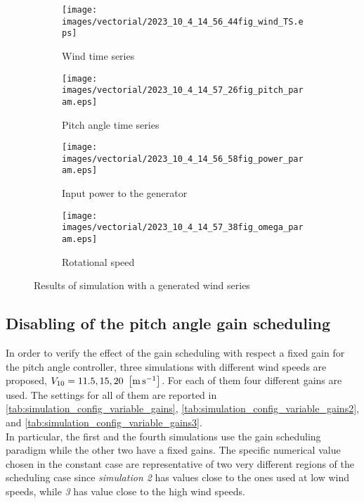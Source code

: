 \begin{figure}[htb]
  \begin{subfigure}{0.49\columnwidth}
    \centering
    \texttt{[image: images/vectorial/2023\_10\_4\_14\_56\_44fig\_wind\_TS.eps]}
    \caption{Wind time series}
    \label{fig:2023_05_1_00_55_48fig_wind_TS.eps}
  \end{subfigure}
  \begin{subfigure}{0.49\columnwidth}
    \centering
    \texttt{[image: images/vectorial/2023\_10\_4\_14\_57\_26fig\_pitch\_param.eps]}
    \caption{Pitch angle time series}
    \label{fig:2023_05_1_00_50_19fig_power_param}
  \end{subfigure}
  \begin{subfigure}{0.49\columnwidth}
    \centering
    \texttt{[image: images/vectorial/2023\_10\_4\_14\_56\_58fig\_power\_param.eps]}
    \caption{Input power to the generator}
    \label{fig:2023_05_1_00_51_17fig_omega_param}
  \end{subfigure}
  \begin{subfigure}{0.49\columnwidth}
    \centering
    \texttt{[image: images/vectorial/2023\_10\_4\_14\_57\_38fig\_omega\_param.eps]}
    \caption{Rotational speed}
    \label{fig:2023_05_1_00_50_58fig_pitch_param}
  \end{subfigure}
  \caption{Results of simulation with a generated wind series}
  \label{fig:simulation_rand_wind_NPC}
\end{figure}

\subsection{Disabling of the pitch angle gain scheduling}\label{subsec:gain_scheduling_disabling}
In order to verify the effect of the gain scheduling with respect a fixed gain for the pitch angle controller, three simulations with different wind speeds are proposed, $V_{10} = 11.5, 15, 20 \ \left[\si{\meter\per\second}\right]$. For each of them four different gains are used. The settings for all of them are reported in \autoref{tab:simulation_config_variable_gains}, \autoref{tab:simulation_config_variable_gains2}, and \autoref{tab:simulation_config_variable_gains3}. \\
In particular, the first and the fourth simulations use the gain scheduling paradigm while the other two have a fixed gains. The specific numerical value chosen in the constant case are representative of two very different regions of the scheduling case since \textit{simulation 2} has values close to the ones used at low wind speeds, while \textit{3} has value close to the high wind speeds. 

